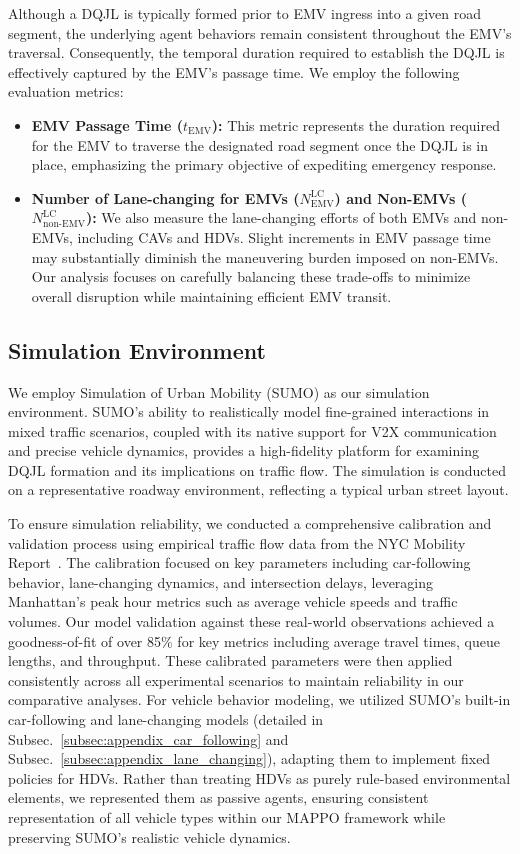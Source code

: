 Although a DQJL is typically formed prior to EMV ingress into a given road segment, the underlying agent behaviors remain consistent throughout the EMV’s traversal. Consequently, the temporal duration required to establish the DQJL is effectively captured by the EMV’s passage time. We employ the following evaluation metrics:

\begin{itemize}
    \item \textbf{EMV Passage Time ($t_{\text{EMV}}$):} This metric represents the duration required for the EMV to traverse the designated road segment once the DQJL is in place, emphasizing the primary objective of expediting emergency response.

    \item \textbf{Number of Lane-changing for EMVs ($N_{\text{EMV}}^{\text{LC}}$) and Non-EMVs ($N_{\text{non-EMV}}^{\text{LC}}$):} We also measure the lane-changing efforts of both EMVs and non-EMVs, including CAVs and HDVs. Slight increments in EMV passage time may substantially diminish the maneuvering burden imposed on non-EMVs. Our analysis focuses on carefully balancing these trade-offs to minimize overall disruption while maintaining efficient EMV transit.
\end{itemize}
\subsection{Simulation Environment}
\label{subsec:simulation}
We employ Simulation of Urban Mobility (SUMO) as our simulation environment. SUMO's ability to realistically model fine-grained interactions in mixed traffic scenarios, coupled with its native support for V2X communication and precise vehicle dynamics, provides a high-fidelity platform for examining DQJL formation and its implications on traffic flow. The simulation is conducted on a representative roadway environment, reflecting a typical urban street layout.

To ensure simulation reliability, we conducted a comprehensive calibration and validation process using empirical traffic flow data from the NYC Mobility Report~\cite{nycdot2019mobility}. The calibration focused on key parameters including car-following behavior, lane-changing dynamics, and intersection delays, leveraging Manhattan's peak hour metrics such as average vehicle speeds and traffic volumes. Our model validation against these real-world observations achieved a goodness-of-fit of over 85\% for key metrics including average travel times, queue lengths, and throughput. These calibrated parameters were then applied consistently across all experimental scenarios to maintain reliability in our comparative analyses. For vehicle behavior modeling, we utilized SUMO's built-in car-following and lane-changing models (detailed in Subsec.~\ref{subsec:appendix_car_following} and Subsec.~\ref{subsec:appendix_lane_changing}), adapting them to implement fixed policies for HDVs. Rather than treating HDVs as purely rule-based environmental elements, we represented them as passive agents, ensuring consistent representation of all vehicle types within our MAPPO framework while preserving SUMO's realistic vehicle dynamics.

